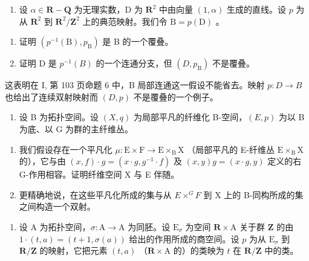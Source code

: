 \exercisegroup

\begin{enumerate}
\def\labelenumi{\arabic{enumi})}
\tightlist
\item
  设 \(\alpha \in \mathbf{R} - \mathbf{Q}\) 为无理实数，D 为 \(\mathbf{R}^2\) 中由向量 \((1, \alpha)\) 生成的直线。设 \(p\) 为从 \(\mathbf{R}^2\) 到 \(\mathbf{R}^2 / \mathbf{Z}^2\) 上的典范映射。我们令 \(\mathrm{B} = p(\mathrm{D})\) 。
\end{enumerate}

\begin{enumerate}
\def\labelenumi{\alph{enumi})}
\item
  证明 \((p^{-1}(\mathrm{B}), p_{\mathrm{B}})\) 是 B 的一个覆叠。
\item
  证明 D 是 \(p^{-1}(B)\) 的一个连通分支，但 \((D, p_{\mathrm{B}})\) 不是覆叠。
\end{enumerate}

这表明在 I, 第 103 页命题 6 中，B 局部连通这一假设不能省去。映射 \(p\colon D \to B\) 也给出了连续双射映射而 \((D,p)\) 不是覆叠的一个例子。

\begin{enumerate}
\def\labelenumi{\arabic{enumi})}
\setcounter{enumi}{1}
\tightlist
\item
  设 B 为拓扑空间。设 \((X,q)\) 为局部平凡的纤维化 B-空间，\((E,p)\) 为以 B 为底、以 G 为群的主纤维丛。
\end{enumerate}

\begin{enumerate}
\def\labelenumi{\alph{enumi})}
\item
  我们假设存在一个平凡化 \(\mu\colon\mathrm{E}\times\mathrm{F}\to\mathrm{E}\times_{\mathrm{B}}\mathrm{X}\) （局部平凡的 E-纤维丛 \(\mathrm{E}\times_{\mathrm{B}}\mathrm{X}\) 的），它与由 \((x,f)\cdot g=(x\cdot g,g^{-1}\cdot f)\) 及 \((x,y)g=(x\cdot g,y)\) 定义的右 G-作用相容。证明纤维空间 X 与 E 伴随。
\item
  更精确地说，在这些平凡化所成的集与从 \(E \times^{G} F\) 到 X 上的 B-同构所成的集之间构造一个双射。
\end{enumerate}

\begin{enumerate}
\def\labelenumi{\arabic{enumi})}
\setcounter{enumi}{2}
\tightlist
\item
  设 A 为拓扑空间，\(\sigma: \mathrm{A} \to \mathrm{A}\) 为同胚。设 \(\mathrm{E}_{\sigma}\) 为空间 \(\mathbf{R} \times \mathrm{A}\) 关于群 \(\mathbf{Z}\) 的由 \(1 \cdot (t, a) = (t + 1, \sigma(a))\) 给出的作用所成的商空间。设 \(p\) 为从 \(\mathrm{E}_{\sigma}\) 到 \(\mathbf{R}/\mathbf{Z}\) 的映射，它把元素 \((t, a)\) （\(\mathbf{R} \times \mathrm{A}\) 的）的类映为 \(t\) 在 \(\mathbf{R}/\mathbf{Z}\) 中的类。
\end{enumerate}

